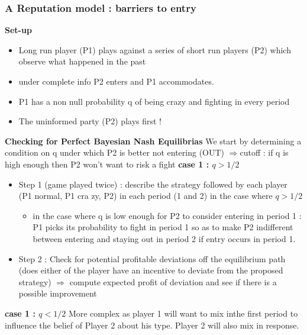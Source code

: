 \documentclass{article}
\begin{document}
\subsubsection{A Reputation model : barriers to entry}
\textbf{Set-up}
\begin{itemize}
    \item Long run player (P1) plays against a series of short run players (P2) which observe what happened in the past
    \item under complete info P2 enters and P1 accommodates. 
    \item P1 has a non null probability q of being crazy and fighting in every period
    \item The uninformed party (P2) plays first ! 
\end{itemize}
\textbf{Checking for Perfect Bayesian Nash Equilibrias}
We start by determining a condition on q under which P2 is better not entering (OUT)
$\Longrightarrow$cutoff : if q is high enough then P2 won't want to risk a fight
\textbf{case 1 : $q>1/2$}
\begin{itemize}
    \item Step 1 (game played twice) : describe the strategy followed by each player (P1 normal, P1 cra zy, P2) in each period (1 and 2) in the case where $q>1/2$
    \begin{itemize}
        \item in the case where q is low enough for P2 to consider entering in period 1 : P1 picks its probability to fight in period 1 so as to make P2 indifferent between entering and staying out in period 2 if entry occurs in period 1. 
    \end{itemize}
    \item Step 2 : Check for potential profitable deviations off the equilibrium path (does either of the player have an incentive to deviate from the proposed strategy) $\Rightarrow$ compute expected profit of deviation and see if there is a possible improvement
\end{itemize}
\textbf{case 1 : $q<1/2$}
More complex as player 1 will want to mix inthe first period to influence the belief of Player 2 about his type. Player 2 will also mix in response. 
\end{document}
